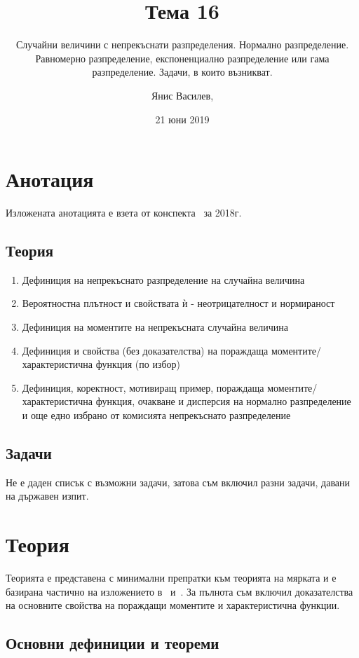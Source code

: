\documentclass[numbers=endperiod, DIV=15, bibliography=totocnumbered]{scrartcl}
\title{Тема 16}
\subtitle{Случайни величини с непрекъснати разпределения. Нормално разпределение. Равномерно разпределение, експоненциално разпределение или гама разпределение. Задачи, в които възникват.}
\author{Янис Василев, \Email{ianis@ivasilev.net}}
\date{21 юни 2019}
\begin{document}
\maketitle

\section{Анотация}

Изложената анотацията е взета от конспекта~\cite{Syllabus} за 2018г.

\subsection{Теория}

\begin{enumerate}
  \item Дефиниция на непрекъснато разпределение на случайна величина
  \item Вероятностна плътност и свойствата ѝ - неотрицателност и нормираност
  \item Дефиниция на моментите на непрекъсната случайна величина
  \item Дефиниция и свойства (без доказателства) на пораждаща моментите/характеристична функция (по избор)
  \item Дефиниция, коректност, мотивиращ пример, пораждаща моментите/характеристична функция, очакване и дисперсия на нормално разпределение и още едно избрано от комисията непрекъснато разпределение
\end{enumerate}

\subsection{Задачи}

Не е даден списък с възможни задачи, затова съм включил разни задачи, давани на държавен изпит.

\section{Теория}

Теорията е представена с минимални препратки към теорията на мярката и е базирана частично на изложението в~\cite{Borovkov} и~\cite{DimitrovYanev}. За пълнота съм включил доказателства на основните свойства на пораждащи моментите и характеристична функции.

\subsection{Основни дефиниции и теореми}
\end{document}
